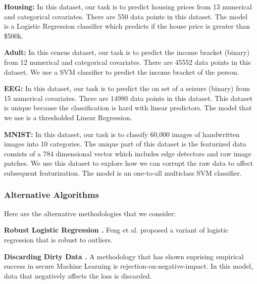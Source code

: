 \vspace{0.5em}

\noindent\textbf{Housing: } In this dataset, our task is to predict housing prices from 13 numerical and categorical covariates. There are 550 data points in this dataset. The model is a Logistic Regression classifier which predicts if the house price is greater than \$500k.

\vspace{0.5em}

\noindent\textbf{Adult: } In this census dataset, our task is to predict the income bracket (binary) from 12 numerical and categorical covariates. There are 45552 data points in this dataset. We use a SVM classifier to predict the income bracket of the person.

\vspace{0.5em}

\noindent\textbf{EEG: } In this dataset, our task is to predict the on set of a seizure (binary) from 15 numerical covariates. There are 14980 data points in this dataset. This dataset is unique because the classification is hard with linear predictors. The model that we use is a thresholded Linear Regression.

\vspace{0.5em}

\noindent\textbf{MNIST: } In this dataset, our task is to classify 60,000 images of handwritten images into 10 categories. The unique part of this dataset is the featurized data consists of a 784 dimensional vector which includes edge detectors and raw image patches. We use this dataset to explore how we can corrupt the raw data to affect subsequent featurization. The model is an one-to-all multiclass SVM classifier. 

\subsubsection{Alternative Algorithms}
Here are the alternative methodologies that we consider:

\vspace{0.5em}

\noindent\textbf{Robust Logistic Regression \cite{feng2014robust}. } Feng et al. proposed a variant of logistic regression that is robust to outliers. 

\vspace{0.5em}

\noindent\textbf{Discarding Dirty Data \cite{li2014improved}. } A methodology that has shown suprising empirical success in secure Machine Learning is rejection-on-negative-impact. In this model, data that negatively affects the loss is discarded.

